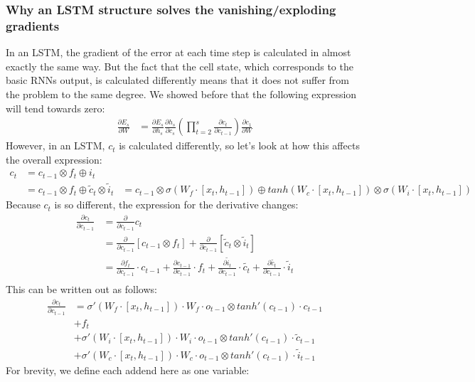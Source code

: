 \subsubsection{Why an LSTM structure solves the vanishing/exploding gradients}
In an LSTM, the gradient of the error at each time step is calculated in almost exactly the same way. But the fact that the cell state, which corresponds to the basic RNNs output, is calculated differently means that it does not suffer from the problem to the same degree. We showed before that the following expression will tend towards zero:
\begin{align}
    \frac{\partial E_s}{\partial W} &= \frac{\partial E_s}{\partial h_s}\frac{\partial h_s}{\partial c_s} \left(\prod_{t=2}^s\frac{\partial c_t}{\partial c_{t-1}} \right) \frac{\partial c_1} {\partial W} 
\end{align}
However, in an LSTM, $c_t$ is calculated differently, so let's look at how this affects the overall expression:
\begin{align}
    c_t &= c_{t-1} \otimes f_t \oplus i_t \\
    &=  c_{t-1} \otimes f_t \oplus \tilde{c}_t \otimes \tilde{i}_t
    &= c_{t-1} \otimes \sigma (W_f \cdot [x_t,h_{t-1}]) \oplus tanh(W_c \cdot [x_t,h_{t-1}]) \otimes \sigma (W_i \cdot [x_t,h_{t-1}])
\end{align}
Because $c_t$ is so different, the expression for the derivative changes:
\begin{align}
    \frac{\partial c_t}{\partial c_{t-1}} &= \frac{\partial}{\partial c_{t-1}} c_t \\
    &= \frac{\partial}{\partial c_{t-1}} \left[c_{t-1} \otimes f_t \right] + \frac{\partial}{\partial c_{t-1}} \left[\tilde{c}_t \otimes \tilde{i}_t \right] \\
    &= \frac{\partial f_t}{\partial c_{t-1}} \cdot c_{t-1} + \frac{\partial c_{t-1}}{\partial c_{t-1}} \cdot f_t + \frac{\partial \tilde{i}_t}{\partial c_{t-1}} \cdot \tilde{c_t} + \frac{\partial \tilde{c_t}}{\partial c_{t-1}} \cdot \tilde{i}_t \\
\end{align}
This can be written out as follows:
\begin{align}
    \frac{\partial c_t}{\partial c_{t-1}} &= \sigma'(W_f \cdot [x_t,h_{t-1}]) \cdot W_f \cdot o_{t-1} \otimes tanh'(c_{t-1}) \cdot c_{t-1} \\
    &+ f_t \\
    &+ \sigma'(W_i \cdot [x_t,h_{t-1}]) \cdot W_i \cdot o_{t-1} \otimes tanh'(c_{t-1}) \cdot \tilde{c}_{t-1} \\
    &+ \sigma'(W_c \cdot [x_t,h_{t-1}]) \cdot W_c \cdot o_{t-1} \otimes tanh'(c_{t-1}) \cdot \tilde{i}_{t-1}
\end{align}
For brevity, we define each addend here as one variable:
%    
